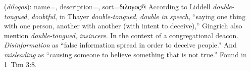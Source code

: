 \item[Disinforming,]

(\textit{dilogos}):
{
    name=,
    description={},
    sort=διλογος@
}
According to Liddell \emph{double-tongued}, \emph{doubtful}, in Thayer \emph{double-tongued}, \emph{double in speech}, ``saying one thing with one person, another with another (with intent to deceive),'' Gingrich also mention \emph{double-tongued}, \emph{insincere}. In the context of a congregational deacon. \emph{Disinformation} as ``false information spread in order to deceive people.'' And \emph{misleading} as ``causing someone to believe something that is not true.''
Found in 1~Tim 3:8.
